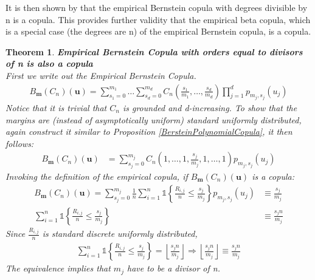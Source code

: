 \documentclass[12pt]{report}
\newtheorem{theorem}{Theorem}[subsection]
\newcommand{\1}{\mathbf{1}}
\begin{document}
\begin{flushleft}
It is then shown by \cite{SegersEBC} that the empirical Bernstein copula with degrees divisible by n is a copula. This provides further validity that the empirical beta copula, which is a special case (the degrees are n) of the empirical Bernstein copula, is a copula.

\begin{theorem}\label{empiricalBersteinPolynomialCopula}
\textit{\normalfont\parencite{SegersEBC}}\:
\textbf{Empirical Bernstein Copula with orders equal to divisors of n is also a copula} \\
First we write out the Empirical Bernstein Copula.
\begin{align*}
B_{\textbf{m}}(C_{n})(\textbf{u}) = \sum\limits_{s_{1} = 0}^{m_{1}} \dots \sum\limits_{s_{d} = 0}^{m_{d}} C_{n} \left(\frac{s_{1}}{m_{1}}, \dots, \frac{s_{d}}{m_{d}} \right) \prod\limits_{j = 1}^{d} p_{m_{j},s_{j}}(u_{j})
\end{align*}
Notice that it is trivial that $C_{n}$ is grounded and d-increasing. To show that the margins are (instead of asymptotically uniform) standard uniformly distributed, again construct it similar to Proposition \ref{BersteinPolynomialCopula}, it then follows:
\begin{align*}
B_{\textbf{m}}(C_{n})(\textbf{u}) &= \sum\limits_{s_{j} = 0}^{m_{j}} C_{n}(1, \dots, 1, \frac{s_{j}}{m_{j}}, 1, \dots, 1) p_{m_{j},s_{j}}(u_{j})
\end{align*}
Invoking the definition of the empirical copula, if $B_{\textbf{m}}(C_{n})(\textbf{u})$ is a copula:
\begin{align*}
B_{\textbf{m}}(C_{n})(\textbf{u}) = \sum\limits_{s_{j} = 0}^{m_{j}} \frac{1}{n} \sum\limits_{i = 1}^{n} \mathds{1} \left\{ \frac{R_{i,j}}{n} \le \frac{s_{j}}{m_{j}} \right\} p_{m_{j},s_{j}}(u_{j}) &\equiv \frac{s_{j}}{m_{j}} \\
\sum\limits_{i = 1}^{n} \mathds{1} \left\{ \frac{R_{i,j}}{n} \le \frac{s_{j}}{m_{j}} \right\} &\equiv \frac{s_{j}n}{m_{j}}
\end{align*}
Since $\frac{R_{i,j}}{n}$ is standard discrete uniformly distributed, 
\begin{align*}
\sum\limits_{i = 1}^{n} \mathds{1} \left\{ \frac{R_{i,j}}{n} \le \frac{s_{j}}{m_{j}} \right\} = \left\lfloor \frac{s_{j}n}{m_{j}} \right\rfloor \Longrightarrow \left\lfloor \frac{s_{j}n}{m_{j}} \right\rfloor \equiv \frac{s_{j}n}{m_{j}}    
\end{align*}
The equivalence implies that $m_{j}$ have to be a divisor of n.
\end{theorem}


\end{flushleft}
\end{document}
